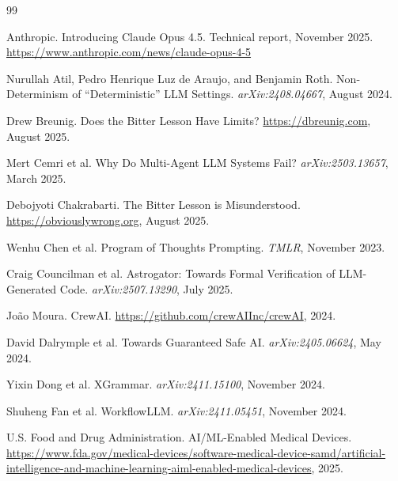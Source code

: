 \documentclass[11pt]{article}
\begin{document}


\begin{thebibliography}{99}

Anthropic. Introducing Claude Opus 4.5. Technical report, November 2025.
\newblock \url{https://www.anthropic.com/news/claude-opus-4-5}

Nurullah Atil, Pedro Henrique Luz de Araujo, and Benjamin Roth.
\newblock Non-Determinism of ``Deterministic'' LLM Settings.
\newblock \emph{arXiv:2408.04667}, August 2024.

Drew Breunig. Does the Bitter Lesson Have Limits? \url{https://dbreunig.com}, August 2025.

Mert Cemri et al. Why Do Multi-Agent LLM Systems Fail? \emph{arXiv:2503.13657}, March 2025.

Debojyoti Chakrabarti. The Bitter Lesson is Misunderstood. \url{https://obviouslywrong.org}, August 2025.

Wenhu Chen et al. Program of Thoughts Prompting. \emph{TMLR}, November 2023.

Craig Councilman et al. Astrogator: Towards Formal Verification of LLM-Generated Code. \emph{arXiv:2507.13290}, July 2025.

Jo\~{a}o Moura. CrewAI. \url{https://github.com/crewAIInc/crewAI}, 2024.

David Dalrymple et al. Towards Guaranteed Safe AI. \emph{arXiv:2405.06624}, May 2024.

Yixin Dong et al. XGrammar. \emph{arXiv:2411.15100}, November 2024.

Shuheng Fan et al. WorkflowLLM. \emph{arXiv:2411.05451}, November 2024.

U.S. Food and Drug Administration. AI/ML-Enabled Medical Devices.
\newblock \url{https://www.fda.gov/medical-devices/software-medical-device-samd/artificial-intelligence-and-machine-learning-aiml-enabled-medical-devices}, 2025.


\end{thebibliography}
\end{document}
